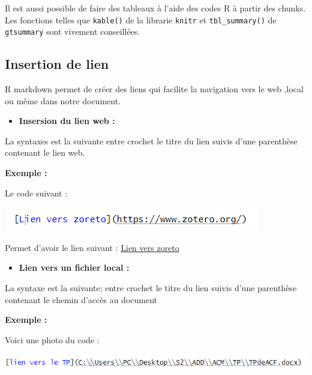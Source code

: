 \documentclass[
  12pt,
]{article}
\providecommand{\tightlist}{%
  \setlength{\itemsep}{0pt}\setlength{\parskip}{0pt}}
\begin{document}
Il est aussi possible de faire des tableaux à l'aide des codes R à
partir des chunks. Les fonctions telles que \texttt{kable()} de la
librarie \texttt{knitr} et \texttt{tbl\_summary()} de \texttt{gtsummary}
sont vivement conseillées.

\subsection{Insertion de lien}\label{insertion-de-lien}

R markdown permet de créer des liens qui facilite la navigation vers le
web ,local ou même dans notre document.

\begin{itemize}
\tightlist
\item
  \textbf{Insersion du lien web :}
\end{itemize}

La syntaxes est la suivante entre crochet le titre du lien suivis d'une
parenthèse contenant le lien web.

\textbf{Exemple :}

Le code suivant :

\begin{center}\includegraphics[width=0.7\linewidth,height=0.7\textheight]{../Document_Rmarkdown/Images/Lien_Zotero} \end{center}

Permet d'avoir le lien suivant : \href{https://www.zotero.org/}{Lien
vers zoreto}

\begin{itemize}
\tightlist
\item
  \textbf{Lien vers un fichier local :}
\end{itemize}

La syntaxe est la suivante; entre crochet le titre du lien suivis d'une
parenthèse contenant le chemin d'accès au document

\textbf{Exemple :}

Voici une photo du code :

\begin{center}\includegraphics[width=0.7\linewidth,height=0.7\textheight]{../Document_Rmarkdown/Images/Lien_Local} \end{center}
\end{document}
